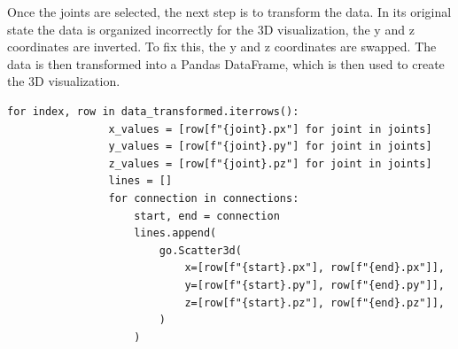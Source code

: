         Once the joints are selected, the next step is to transform the data. In its original state the data is organized incorrectly for the 3D visualization, the y and z coordinates are inverted. To fix this, the y and z coordinates are swapped. The data is then transformed into a Pandas DataFrame, which is then used to create the 3D visualization. \\

        \newpage

        \begin{lstlisting}[caption={Traditional approach to splitting the data into training and testing sets.}, label={lst:badsplit}]            
            for index, row in data_transformed.iterrows():
                x_values = [row[f"{joint}.px"] for joint in joints]
                y_values = [row[f"{joint}.py"] for joint in joints]
                z_values = [row[f"{joint}.pz"] for joint in joints]
                lines = []
                for connection in connections:
                    start, end = connection
                    lines.append(
                        go.Scatter3d(
                            x=[row[f"{start}.px"], row[f"{end}.px"]],
                            y=[row[f"{start}.py"], row[f"{end}.py"]],
                            z=[row[f"{start}.pz"], row[f"{end}.pz"]],
                        )
                    )
        \end{lstlisting}

